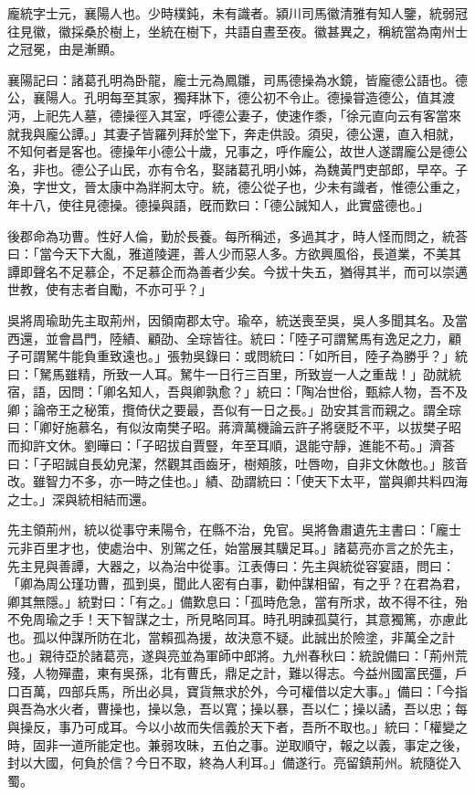 
\begin{pinyinscope}
龐統字士元，襄陽人也。少時樸鈍，未有識者。潁川司馬徽清雅有知人鑒，統弱冠往見徽，徽採桑於樹上，坐統在樹下，共語自晝至夜。徽甚異之，稱統當為南州士之冠冕，由是漸顯。

襄陽記曰：諸葛孔明為卧龍，龐士元為鳳雛，司馬德操為水鏡，皆龐德公語也。德公，襄陽人。孔明每至其家，獨拜牀下，德公初不令止。德操甞造德公，值其渡沔，上祀先人墓，德操徑入其室，呼德公妻子，使速作黍，「徐元直向云有客當來就我與龐公譚。」其妻子皆羅列拜於堂下，奔走供設。須臾，德公還，直入相就，不知何者是客也。德操年小德公十歲，兄事之，呼作龐公，故世人遂謂龐公是德公名，非也。德公子山民，亦有令名，娶諸葛孔明小姊，為魏黃門吏部郎，早卒。子渙，字世文，晉太康中為牂牁太守。統，德公從子也，少未有識者，惟德公重之，年十八，使往見德操。德操與語，旣而歎曰：「德公誠知人，此實盛德也。」

後郡命為功曹。性好人倫，勤於長養。每所稱述，多過其才，時人怪而問之，統荅曰：「當今天下大亂，雅道陵遲，善人少而惡人多。方欲興風俗，長道業，不美其譚即聲名不足慕企，不足慕企而為善者少矣。今拔十失五，猶得其半，而可以崇邁世教，使有志者自勵，不亦可乎？」

吳將周瑜助先主取荊州，因領南郡太守。瑜卒，統送喪至吳，吳人多聞其名。及當西還，並會昌門，陸績、顧劭、全琮皆往。統曰：「陸子可謂駑馬有逸足之力，顧子可謂駑牛能負重致遠也。」張勃吳錄曰：或問統曰：「如所目，陸子為勝乎？」統曰：「駑馬雖精，所致一人耳。駑牛一日行三百里，所致豈一人之重哉！」劭就統宿，語，因問：「卿名知人，吾與卿孰愈？」統曰：「陶冶世俗，甄綜人物，吾不及卿；論帝王之秘策，攬倚伏之要最，吾似有一日之長。」劭安其言而親之。謂全琮曰：「卿好施慕名，有似汝南樊子昭。蔣濟萬機論云許子將襃貶不平，以拔樊子昭而抑許文休。劉曄曰：「子昭拔自賈豎，年至耳順，退能守靜，進能不苟。」濟荅曰：「子昭誠自長幼皃潔，然觀其臿齒牙，樹頰胲，吐唇吻，自非文休敵也。」胲音改。雖智力不多，亦一時之佳也。」績、劭謂統曰：「使天下太平，當與卿共料四海之士。」深與統相結而還。

先主領荊州，統以從事守耒陽令，在縣不治，免官。吳將魯肅遺先主書曰：「龐士元非百里才也，使處治中、別駕之任，始當展其驥足耳。」諸葛亮亦言之於先主，先主見與善譚，大器之，以為治中從事。江表傳曰：先主與統從容宴語，問曰：「卿為周公瑾功曹，孤到吳，聞此人密有白事，勸仲謀相留，有之乎？在君為君，卿其無隱。」統對曰：「有之。」備歎息曰：「孤時危急，當有所求，故不得不往，殆不免周瑜之手！天下智謀之士，所見略同耳。時孔明諫孤莫行，其意獨篤，亦慮此也。孤以仲謀所防在北，當賴孤為援，故決意不疑。此誠出於險塗，非萬全之計也。」親待亞於諸葛亮，遂與亮並為軍師中郎將。九州春秋曰：統說備曰：「荊州荒殘，人物殫盡，東有吳孫，北有曹氏，鼎足之計，難以得志。今益州國富民彊，戶口百萬，四部兵馬，所出必具，寶貨無求於外，今可權借以定大事。」備曰：「今指與吾為水火者，曹操也，操以急，吾以寬；操以暴，吾以仁；操以譎，吾以忠；每與操反，事乃可成耳。今以小故而失信義於天下者，吾所不取也。」統曰：「權變之時，固非一道所能定也。兼弱攻昧，五伯之事。逆取順守，報之以義，事定之後，封以大國，何負於信？今日不取，終為人利耳。」備遂行。亮留鎮荊州。統隨從入蜀。


\end{pinyinscope}
